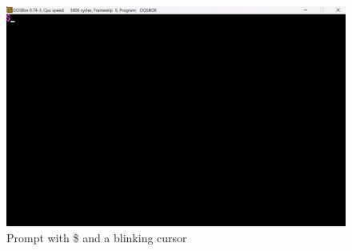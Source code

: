 \documentclass{article}
\begin{document}
    \begin{figure}[H]  %
        \centering
        \includegraphics[width=\textwidth]{prompt} %
        \caption{Prompt with \$ and a blinking cursor}
        \label{fig:2}
    \end{figure}
\end{document}
